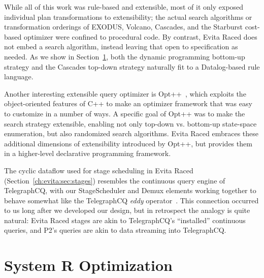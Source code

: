 While all of this work was rule-based and extensible, most of it only exposed
individual plan transformations to extensibility; the actual search algorithms
or transformation orderings of EXODUS, Volcano, Cascades, and the Starburst
cost-based optimizer were confined to procedural code.  By contrast, Evita Raced
does not embed a search algorithm, instead leaving that open to specification
as needed.  As we show in Section~\ref{ch:opt:sec:systemr}, both the dynamic programming
bottom-up strategy and the Cascades top-down strategy naturally fit to a
Datalog-based rule language.

Another interesting extensible query optimizer is Opt++~\cite{kabradewitt},
which exploits the object-oriented features of C++ to make an optimizer
framework that was easy to customize in a number of ways.  A specific goal of
Opt++ was to make the search strategy extensible, enabling not only top-down
vs.  bottom-up state-space enumeration, but also randomized search algorithms.
Evita Raced embraces these additional dimensions of extensibility introduced by
Opt++, but provides them in a higher-level declarative programming framework.

The cyclic dataflow used for stage scheduling in Evita Raced
(Section~\ref{ch:evita:sec:stages}) resembles the continuous query engine of
TelegraphCQ, with our StageScheduler and Demux elements working together to
behave somewhat like the TelegraphCQ {\em eddy} operator~\cite{tcq-cidr}.  This
connection occurred to us long after we developed our design, but in retrospect
the analogy is quite natural: Evita Raced stages are akin to TelegraphCQ's
``installed'' continuous queries, and P2's \OVERLOG queries are akin to data
streaming into TelegraphCQ.


\section{System R Optimization}
\label{ch:opt:sec:systemr}

